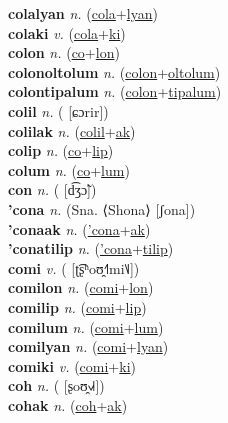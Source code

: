 \textbf{colalyan} \textit{n.} (\hyperref[cola]{cola}+\hyperref[lyan]{lyan})
 \label{colalyan} \\
\textbf{colaki} \textit{v.} (\hyperref[cola]{cola}+\hyperref[ki]{ki})
 \label{colaki} \\
\textbf{colon} \textit{n.} (\hyperref[co]{co}+\hyperref[lon]{lon})
 \label{colon} \\
\textbf{colonoltolum} \textit{n.} (\hyperref[colon]{colon}+\hyperref[oltolum]{oltolum})
 \label{colonoltolum} \\
\textbf{colontipalum} \textit{n.} (\hyperref[colon]{colon}+\hyperref[tipalum]{tipalum})
 \label{colontipalum} \\
\textbf{colil} \textit{n.} ( [ɕɔrir])
 \label{colil} \\
\textbf{colilak} \textit{n.} (\hyperref[colil]{colil}+\hyperref[ak]{ak})
 \label{colilak} \\
\textbf{colip} \textit{n.} (\hyperref[co]{co}+\hyperref[lip]{lip})
 \label{colip} \\
\textbf{colum} \textit{n.} (\hyperref[co]{co}+\hyperref[lum]{lum})
 \label{colum} \\
\textbf{con} \textit{n.} ( [d͡ʒɔ̃])
 \label{con} \\
\textbf{'cona} \textit{n.} (Sna. ⟨Shona⟩ [ʃona])
 \label{'cona} \\
\textbf{'conaak} \textit{n.} (\hyperref['cona]{'cona}+\hyperref[ak]{ak})
 \label{'conaak} \\
\textbf{'conatilip} \textit{n.} (\hyperref['cona]{'cona}+\hyperref[tilip]{tilip})
 \label{'conatilip} \\
\textbf{comi} \textit{v.} ( [ʈ͡ʂʰoʊ̯˧˥mi˥˩])
 \label{comi} \\
\textbf{comilon} \textit{n.} (\hyperref[comi]{comi}+\hyperref[lon]{lon})
 \label{comilon} \\
\textbf{comilip} \textit{n.} (\hyperref[comi]{comi}+\hyperref[lip]{lip})
 \label{comilip} \\
\textbf{comilum} \textit{n.} (\hyperref[comi]{comi}+\hyperref[lum]{lum})
 \label{comilum} \\
\textbf{comilyan} \textit{n.} (\hyperref[comi]{comi}+\hyperref[lyan]{lyan})
 \label{comilyan} \\
\textbf{comiki} \textit{v.} (\hyperref[comi]{comi}+\hyperref[ki]{ki})
 \label{comiki} \\
\textbf{coh} \textit{n.} ( [ʂoʊ̯˧˩˧])
 \label{coh} \\
\textbf{cohak} \textit{n.} (\hyperref[coh]{coh}+\hyperref[ak]{ak})
